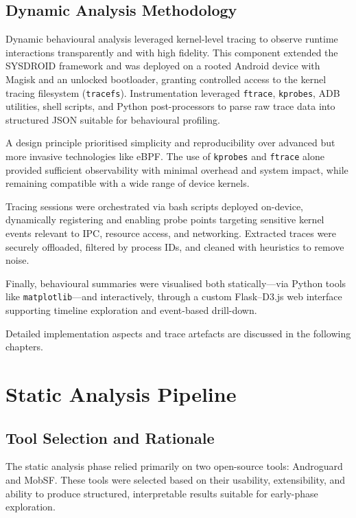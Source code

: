 \documentclass[a4paper,12pt]{report}
\begin{document}
\subsection{Dynamic Analysis Methodology}

Dynamic behavioural analysis leveraged kernel-level tracing to observe runtime interactions transparently and with high fidelity. This component extended the \textsc{SYSDROID} framework and was deployed on a rooted Android device with Magisk and an unlocked bootloader, granting controlled access to the kernel tracing filesystem (\texttt{tracefs}). Instrumentation leveraged \texttt{ftrace}, \texttt{kprobes}, ADB utilities, shell scripts, and Python post-processors to parse raw trace data into structured JSON suitable for behavioural profiling.

A design principle prioritised simplicity and reproducibility over advanced but more invasive technologies like eBPF. The use of \texttt{kprobes} and \texttt{ftrace} alone provided sufficient observability with minimal overhead and system impact, while remaining compatible with a wide range of device kernels.

Tracing sessions were orchestrated via bash scripts deployed on-device, dynamically registering and enabling probe points targeting sensitive kernel events relevant to IPC, resource access, and networking. Extracted traces were securely offloaded, filtered by process IDs, and cleaned with heuristics to remove noise.

Finally, behavioural summaries were visualised both statically—via Python tools like \texttt{matplotlib}—and interactively, through a custom Flask–D3.js web interface supporting timeline exploration and event-based drill-down.

Detailed implementation aspects and trace artefacts are discussed in the following chapters.

\section{Static Analysis Pipeline}

\subsection{Tool Selection and Rationale}

The static analysis phase relied primarily on two open-source tools: Androguard and MobSF. These tools were selected based on their usability, extensibility, and ability to produce structured, interpretable results suitable for early-phase exploration.
\end{document}
